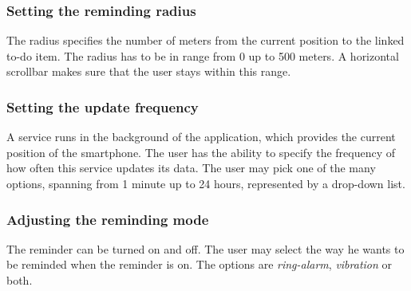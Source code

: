 \subsubsection{Setting the reminding radius}
The radius specifies the number of meters from the current position to the
linked to-do item. The radius has to be in range from 0 up to 500 meters. A
horizontal scrollbar makes sure that the user stays within this range.
\subsubsection{Setting the update frequency}
A service runs in the background of the application, which provides the current
position of the smartphone. The user has the ability to specify the frequency of
how often this service updates its data. The user may pick one of the many
options, spanning from 1 minute up to 24 hours, represented by a drop-down list.
\subsubsection{Adjusting the reminding mode}
The reminder can be turned on and off. The user may select the way he wants to
be reminded when the reminder is on. The options are \emph{ring-alarm},
\emph{vibration} or both.
